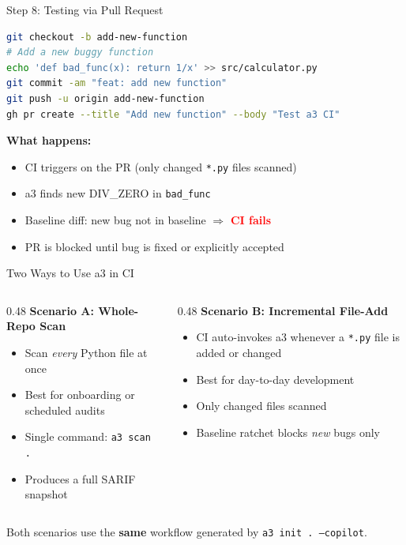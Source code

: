 \documentclass[aspectratio=169]{beamer}
\begin{document}
\begin{frame}[fragile]{Step 8: Testing via Pull Request}
\begin{lstlisting}[language=bash]
git checkout -b add-new-function
# Add a new buggy function
echo 'def bad_func(x): return 1/x' >> src/calculator.py
git commit -am "feat: add new function"
git push -u origin add-new-function
gh pr create --title "Add new function" --body "Test a3 CI"
\end{lstlisting}

\textbf{What happens:}
\begin{itemize}
  \item CI triggers on the PR (only changed \texttt{*.py} files scanned)
  \item a3 finds new DIV\_ZERO in \texttt{bad\_func}
  \item Baseline diff: new bug not in baseline $\Rightarrow$ \textcolor{red}{\textbf{CI fails}}
  \item PR is blocked until bug is fixed or explicitly accepted
\end{itemize}
\end{frame}


\begin{frame}{Two Ways to Use a3 in CI}
\begin{columns}[T]
\begin{column}{0.48\textwidth}
\textbf{Scenario A: Whole-Repo Scan}
\begin{itemize}
  \item Scan \emph{every} Python file at once
  \item Best for onboarding or scheduled audits
  \item Single command: \texttt{a3 scan .}
  \item Produces a full SARIF snapshot
\end{itemize}
\end{column}
\begin{column}{0.48\textwidth}
\textbf{Scenario B: Incremental File-Add}
\begin{itemize}
  \item CI auto-invokes a3 whenever a \texttt{*.py} file is added or changed
  \item Best for day-to-day development
  \item Only changed files scanned
  \item Baseline ratchet blocks \emph{new} bugs only
\end{itemize}
\end{column}
\end{columns}

\bigskip
\centering
Both scenarios use the \textbf{same} workflow generated by \texttt{a3 init .\ --copilot}.
\end{frame}
\end{document}
